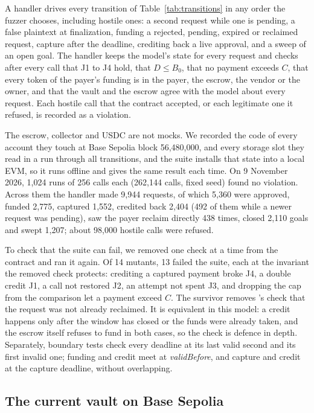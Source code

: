 A handler drives every transition of Table~\ref{tab:transitions} in any order the fuzzer chooses, including hostile ones: a second request while one is
pending, a false plaintext at finalization, funding a rejected, pending, expired or reclaimed request, capture after the deadline, crediting back a
live approval, and a sweep of an open goal. The handler keeps the model's state for every request and checks after every call that J1 to J4 hold, that
$D \le B_0$, that no payment exceeds $C$, that every token of the payer's funding is in the payer, the escrow, the vendor or the owner, and that the
vault and the escrow agree with the model about every request. Each hostile call that the contract accepted, or each legitimate one it refused, is
recorded as a violation.

The escrow, collector and USDC are not mocks. We recorded the code of every account they touch at Base Sepolia block 56{,}480{,}000, and every storage slot
they read in a run through all transitions, and the suite installs that state into a local EVM, so it runs offline and gives the same result each time.
On 9 November 2026, 1{,}024 runs of 256 calls each (262{,}144 calls, fixed seed) found no violation. Across them the handler made 9{,}944 requests, of
which 5{,}360 were approved, funded 2{,}775, captured 1{,}552, credited back 2{,}404 (492 of them while a newer request was pending), saw the payer reclaim
directly 438 times, closed 2{,}110 goals and swept 1{,}207; about 98{,}000 hostile calls were refused.

To check that the suite can fail, we removed one check at a time from the contract and ran it again. Of 14 mutants, 13 failed the suite, each at the
invariant the removed check protects: crediting a captured payment broke J4, a double credit J1, a call not restored J2, an attempt not spent J3, and
dropping the cap from the comparison let a payment exceed $C$. The survivor removes 's check that the request was not already
reclaimed. It is equivalent in this model: a credit happens only after the window has closed or the funds were already taken, and the escrow itself
refuses to fund in both cases, so the check is defence in depth. Separately, boundary tests check every deadline at its last valid second and its
first invalid one; funding and credit meet at \textit{validBefore}, and capture and credit at the capture deadline, without overlapping.

\subsection{The current vault on Base Sepolia}
\label{sec:liveeval}

